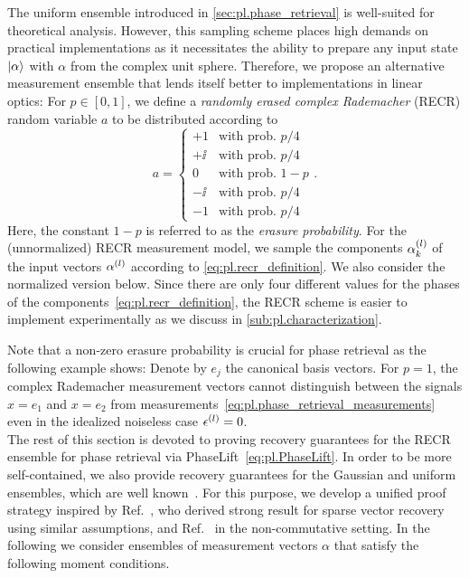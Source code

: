 The uniform ensemble introduced in \cref{sec:pl.phase_retrieval} is well-suited for theoretical analysis.
However, this sampling scheme places high demands on practical implementations as it necessitates the ability to prepare any input state $\ket{\alpha}$ with $\alpha$ from the complex unit sphere.
Therefore, we propose an alternative measurement ensemble that lends itself better to implementations in linear optics:
For $p \in [0,1]$, we define a \emph{randomly erased complex Rademacher} (RECR) random variable $a$ to be distributed according to
\[
  a =
  \begin{cases}
    +1 & \textrm{with prob. } p/4 \\
    +\ii & \textrm{with prob. } p/4 \\
    0 & \textrm{with prob. } 1-p \\
    -\ii & \textrm{with prob. } p/4 \\
    -1 & \textrm{with prob. } p/4
  \end{cases}.
  \label{eq:pl.recr_definition}
\]
Here, the constant $1 - p$ is referred to as the \emph{erasure probability}.
For the (unnormalized) RECR measurement model, we sample the components $\alpha^{(l)}_k$ of the input vectors $\alpha^{(l)}$ according to \cref{eq:pl.recr_definition}.
We also consider the normalized version below.
Since there are only four different values for the phases of the components~\eqref{eq:pl.recr_definition}, the RECR scheme is easier to implement experimentally as we discuss in \cref{sub:pl.characterization}.

Note that a non-zero erasure probability is crucial for phase retrieval as the following example shows:
Denote by $e_j$ the canonical basis vectors.
For $p=1$, the complex Rademacher measurement vectors cannot distinguish between the signals $x = e_1$ and $x = e_2$ from measurements~\eqref{eq:pl.phase_retrieval_measurements} even in the idealized noiseless case $\epsilon^{(l)} = 0$.\\



The rest of this section is devoted to proving recovery guarantees for the RECR ensemble for phase retrieval via PhaseLift~\eqref{eq:pl.PhaseLift}.
In order to be more self-contained, we also provide recovery guarantees for the Gaussian and uniform ensembles, which are well known~\cite{Candes_2012_Solving,Demanet_2014_Stable}.
For this purpose, we develop a unified proof strategy inspired by Ref.~\cite{Dirksen_2017_On}, who derived strong result for sparse vector recovery using similar assumptions, and Ref.~\cite{Kabanava_2015_Stable} in the non-commutative setting.
In the following we consider ensembles of measurement vectors $\alpha$ that satisfy the following moment conditions.

